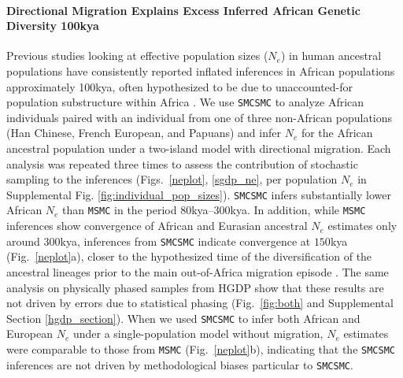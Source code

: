 \documentclass{article}
\begin{document}
\paragraph{Directional Migration Explains Excess Inferred African Genetic Diversity 100kya} Previous studies looking at effective population sizes ($N_e$) in human ancestral populations have consistently reported inflated inferences in African populations approximately 100kya, often hypothesized to be due to unaccounted-for population substructure within Africa \cite{Li2011,Schiffels2014}. We use {\tt SMCSMC} to analyze African individuals paired with an individual from one of three non-African populations (Han Chinese, French European, and Papuans) and infer $N_e$ for the African ancestral population under a two-island model with directional migration.  Each analysis was repeated three times to assess the contribution of stochastic sampling to the inferences (Figs.\ \ref{neplot}, \ref{sgdp_ne}, per population $N_e$ in Supplemental Fig. \ref{fig:individual_pop_sizes}). {\tt SMCSMC} infers substantially lower African $N_e$ than {\tt MSMC} in the period $80$kya--$300$kya.  In addition, while {\tt MSMC} inferences show convergence of African and Eurasian ancestral $N_e$ estimates only around $300$kya, inferences from {\tt SMCSMC} indicate convergence at $150$kya (Fig.\ \ref{neplot}a), closer to the hypothesized time of the diversification of the ancestral lineages prior to the main out-of-Africa migration episode \cite{Timmermann2016, Malaspinas2016}. The same analysis on physically phased samples from HGDP show that these results are not driven by errors due to statistical phasing (Fig.\ \ref{fig:both} and Supplemental Section \ref{hgdp_section}). When we used {\tt SMCSMC} to infer both African and European $N_e$ under a single-population model without migration, $N_e$ estimates were comparable to those from {\tt MSMC} (Fig.\ \ref{neplot}b), indicating that the {\tt SMCSMC} inferences are not driven by methodological biases particular to {\tt SMCSMC}.
\end{document}
